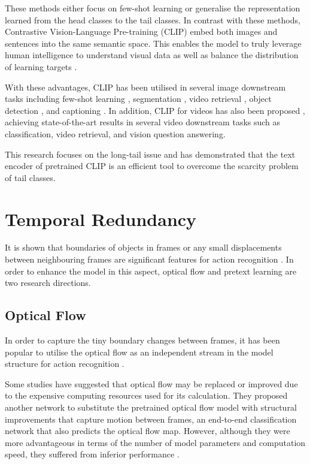 These methods either focus on few-shot learning or generalise the representation learned from the head classes to the tail classes. In contrast with these methods, Contrastive Vision-Language Pre-training (CLIP) \parencite{radford2021learning} embed both images and sentences into the same semantic space. This enables the model to truly leverage human intelligence to understand visual data as well as balance the distribution of learning targets \parencite{ma2022x}. 

With these advantages, CLIP has been utilised in several image downstream tasks including few-shot learning \parencite{zhang2022tip}, segmentation \parencite{wang2022cris}, video retrieval \parencite{ma2022x}, object detection \parencite{lin2023gridclip}, and captioning \parencite{mokady2021clipcap}. In addition, CLIP for videos has also been proposed \parencite{xu-etal-2021-videoclip, wang2022internvideo}, achieving state-of-the-art results in several video downstream tasks such as classification, video retrieval, and vision question answering.

This research focuses on the long-tail issue and has demonstrated that the text encoder of pretrained CLIP is an efficient tool to overcome the scarcity problem of tail classes.


\section{Temporal Redundancy}
It is shown that boundaries of objects in frames or any small displacements between neighbouring frames are significant features for action recognition \parencite{10.1007/978-3-030-12939-2_20}. In order to enhance the model in this aspect, optical flow and pretext learning are two research directions. 

\subsection{Optical Flow}
In order to capture the tiny boundary changes between frames, it has been popular to utilise the optical flow as an independent stream in the model structure for action recognition \parencite{sevilla2019integration}. 

Some studies have suggested that optical flow may be replaced or improved due to the expensive computing resources used for its calculation. They proposed another network to substitute the pretrained optical flow model with structural improvements that capture motion between frames, an end-to-end classification network that also predicts the optical flow map. However, although they were more advantageous in terms of the number of model parameters and computation speed, they suffered from inferior performance \parencite{Lee_2018_ECCV, 8354283, Piergiovanni_2019_CVPR}.

